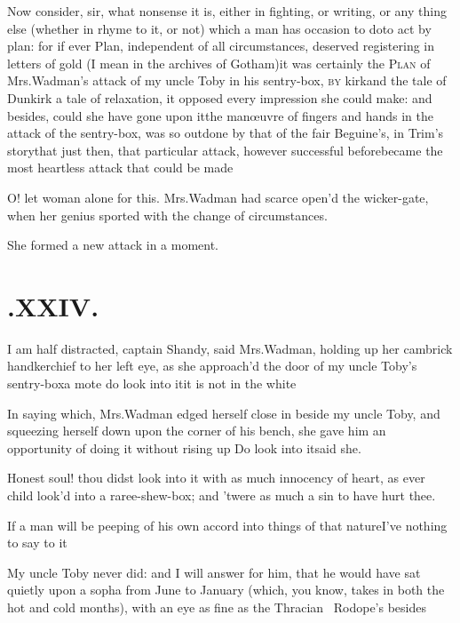 \documentclass{article}
\begin{document}
Now consider, sir, what nonsense it is, either in fighting, or
writing, or any thing else (whether in rhyme to it, or not) which a
man has occasion to do\tsk\break to act by plan: for if ever Plan,
independent of all circumstances, deserved registering in letters
of gold (I mean in the archives of Gotham)\tsk it was
certainly the \textsc{Plan} of Mrs.\@ Wadman’s
attack of my uncle Toby in his sentry-box, \textsc{by}
kirk\tsk and the tale
of Dunkirk a tale of relaxation, it opposed every impression
she could make: and besides, could she have gone upon it\tsk the
manœuvre of fingers and hands in the attack of the
sentry-box, was so outdone by that of the fair Beguine’s, in Trim’s
story\tsk that just then, that particular attack, however
successful before\tsk became the most heartless attack that could
be made\tsh

O! let woman alone for this. Mrs.\@ Wadman had scarce
open’d the wicker-gate, when her genius sported with the
change of circumstances.

\tsh She formed a new attack in a moment.

\vfill{}\eject\null
\section{.\enspace XXIV.}

\quad\tsh I am half distracted, captain Shandy, said
Mrs.\@ Wadman, holding up her cambrick handkerchief to her
left eye, as she approach’d the door of my uncle
Toby’s sentry-box\tsh a mote \tsh\break
{}
do look into it\tsk it is not in the white\tsk 

In saying which, Mrs.\@ Wadman edged herself close in
beside my uncle Toby, and squeezing herself down upon the
corner of his bench, she gave him an opportunity of doing it without rising up 
\tsh Do look into it\tsk said she.

Honest soul! thou didst look into it with as much innocency of
heart, as ever child look’d into a raree-shew-box; and
’twere as much a sin to have hurt thee.

\tsh If a man will be peeping of his own accord into
things of that nature\break\tsh I’ve nothing to say to
it\tsh

My uncle Toby never did: and I will answer for him, that he
would have sat quietly upon a sopha from June to January (which,
you know, takes in both the hot and cold months), with an eye as
fine as the Thracian \fnast\  Rodope’s besides\break
\end{document}
